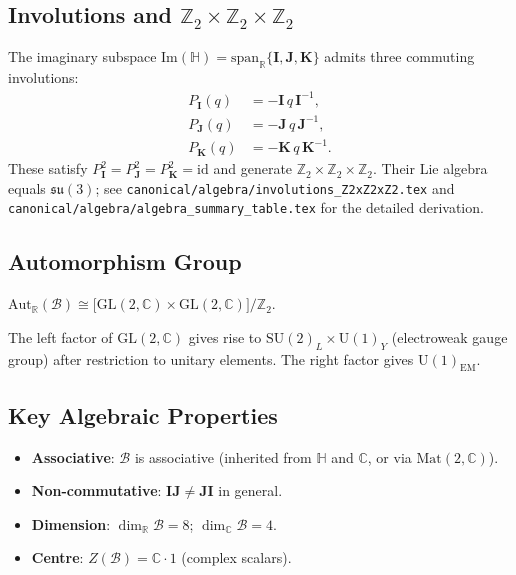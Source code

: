 \subsection{Involutions and $\mathbb{Z}_2 \times \mathbb{Z}_2 \times \mathbb{Z}_2$}

The imaginary subspace $\mathrm{Im}(\mathbb{H}) = \mathrm{span}_{\mathbb{R}}\{\mathbf{I},
\mathbf{J}, \mathbf{K}\}$ admits three commuting involutions:
\begin{align}
  P_{\mathbf{I}}(q) &= -\mathbf{I}\,q\,\mathbf{I}^{-1}, \\
  P_{\mathbf{J}}(q) &= -\mathbf{J}\,q\,\mathbf{J}^{-1}, \\
  P_{\mathbf{K}}(q) &= -\mathbf{K}\,q\,\mathbf{K}^{-1}.
\end{align}
These satisfy $P_{\mathbf{I}}^2 = P_{\mathbf{J}}^2 = P_{\mathbf{K}}^2 = \mathrm{id}$
and generate $\mathbb{Z}_2 \times \mathbb{Z}_2 \times \mathbb{Z}_2$.
Their Lie algebra equals $\mathfrak{su}(3)$; see
\texttt{canonical/algebra/involutions\_Z2xZ2xZ2.tex} and
\texttt{canonical/algebra/algebra\_summary\_table.tex}
for the detailed derivation.

\subsection{Automorphism Group}

\begin{proposition}
  \label{prop:aut_B}
  $\mathrm{Aut}_{\mathbb{R}}(\mathcal{B}) \cong
  \bigl[\mathrm{GL}(2,\mathbb{C}) \times \mathrm{GL}(2,\mathbb{C})\bigr]/\mathbb{Z}_2.$
\end{proposition}

The left factor of $\mathrm{GL}(2,\mathbb{C})$ gives rise to $\mathrm{SU}(2)_L \times
\mathrm{U}(1)_Y$ (electroweak gauge group) after restriction to unitary elements.
The right factor gives $\mathrm{U}(1)_{\mathrm{EM}}$.

\subsection{Key Algebraic Properties}

\begin{itemize}
  \item \textbf{Associative}: $\mathcal{B}$ is associative (inherited from
    $\mathbb{H}$ and $\mathbb{C}$, or via $\mathrm{Mat}(2,\mathbb{C})$).
  \item \textbf{Non-commutative}: $\mathbf{I}\mathbf{J} \neq \mathbf{J}\mathbf{I}$
    in general.
  \item \textbf{Dimension}: $\dim_{\mathbb{R}} \mathcal{B} = 8$;
    $\dim_{\mathbb{C}} \mathcal{B} = 4$.
  \item \textbf{Centre}: $Z(\mathcal{B}) = \mathbb{C} \cdot 1$ (complex scalars).
\end{itemize}

